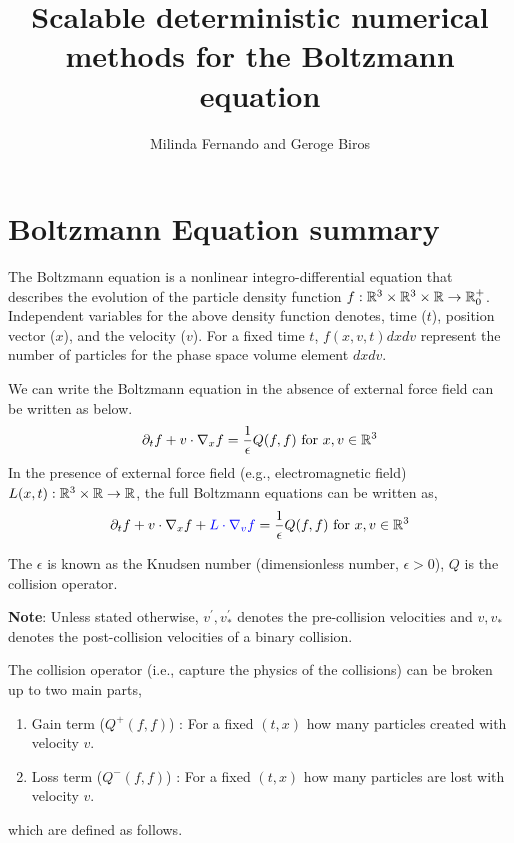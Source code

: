\documentclass{article}
\title{Scalable deterministic numerical methods for the Boltzmann equation}
\author{Milinda Fernando and Geroge Biros}
\begin{document}
\begin{titlepage}
\maketitle
\end{titlepage}

\section{Boltzmann Equation summary}
The Boltzmann equation is a nonlinear integro-differential equation that describes the evolution of the particle density function $f : \mathbb{R}^3 \times \mathbb{R}^3 \times \mathbb{R} \rightarrow \mathbb{R}^{+}_0$. Independent variables for the above density function denotes, time ($t$), position vector ($x$), and the velocity ($v$). For a fixed time $t$, $f(x,v,t)dx dv$ represent the number of particles for the phase space volume element $dxdv$. 

We can write the Boltzmann equation in the absence of external force field can be written as below. 
\begin{equation}
    \partial_t f + v\cdot \nabla_x f = \frac{1}{\epsilon}Q(f,f) \text{ for } x,v \in \mathbb{R}^3 \label{eq:be}
\end{equation}
In the presence of external force field (e.g., electromagnetic field) $L(x,t) : \mathbb{R}^3 \times \mathbb{R} \rightarrow \mathbb{R}$, the full Boltzmann equations can be written as, 
\begin{equation}
    \partial_t f + v\cdot \nabla_x f  + \textcolor{blue}{L \cdot \nabla_v f} = \frac{1}{\epsilon}Q(f,f) \text{ for } x,v \in \mathbb{R}^3 \label{eq:be_full}
\end{equation}

The $\epsilon$ is known as the Knudsen number (dimensionless number, $\epsilon > 0$), $Q$ is the collision operator. 

\textbf{Note}: Unless stated otherwise, $v^\prime,v_*^\prime$ denotes the pre-collision velocities and $v,v_*$ denotes the post-collision velocities of a binary collision.

The collision operator (i.e., capture the physics of the collisions) can be broken up to two main parts, 
\begin{enumerate}
    \item Gain term ($Q^+(f,f)$) : For a fixed $(t,x)$ how many particles created with velocity $v$.
    \item Loss term ($Q^-(f,f)$) : For a fixed $(t,x)$ how many particles are lost with velocity $v$.
\end{enumerate} which are defined as follows. 
\end{document}
